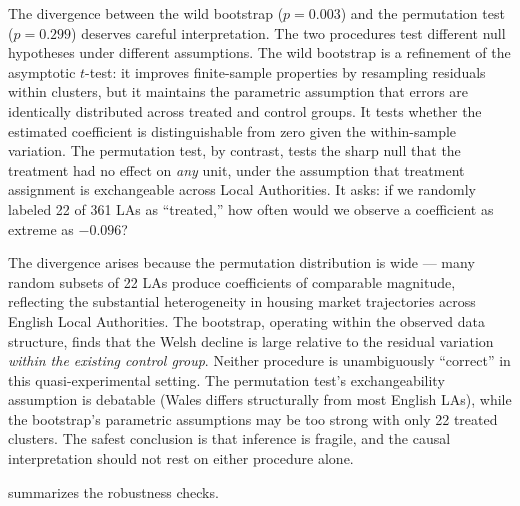 \documentclass[12pt]{article}
\begin{document}
The divergence between the wild bootstrap ($p = 0.003$) and the permutation test ($p = 0.299$) deserves careful interpretation. The two procedures test different null hypotheses under different assumptions. The wild bootstrap is a refinement of the asymptotic $t$-test: it improves finite-sample properties by resampling residuals within clusters, but it maintains the parametric assumption that errors are identically distributed across treated and control groups. It tests whether the estimated coefficient is distinguishable from zero given the within-sample variation. The permutation test, by contrast, tests the sharp null that the treatment had no effect on \textit{any} unit, under the assumption that treatment assignment is exchangeable across Local Authorities. It asks: if we randomly labeled 22 of 361 LAs as ``treated,'' how often would we observe a coefficient as extreme as $-0.096$?

The divergence arises because the permutation distribution is wide --- many random subsets of 22 LAs produce coefficients of comparable magnitude, reflecting the substantial heterogeneity in housing market trajectories across English Local Authorities. The bootstrap, operating within the observed data structure, finds that the Welsh decline is large relative to the residual variation \textit{within the existing control group}. Neither procedure is unambiguously ``correct'' in this quasi-experimental setting. The permutation test's exchangeability assumption is debatable (Wales differs structurally from most English LAs), while the bootstrap's parametric assumptions may be too strong with only 22 treated clusters. The safest conclusion is that inference is fragile, and the causal interpretation should not rest on either procedure alone.

 summarizes the robustness checks.
\end{document}
